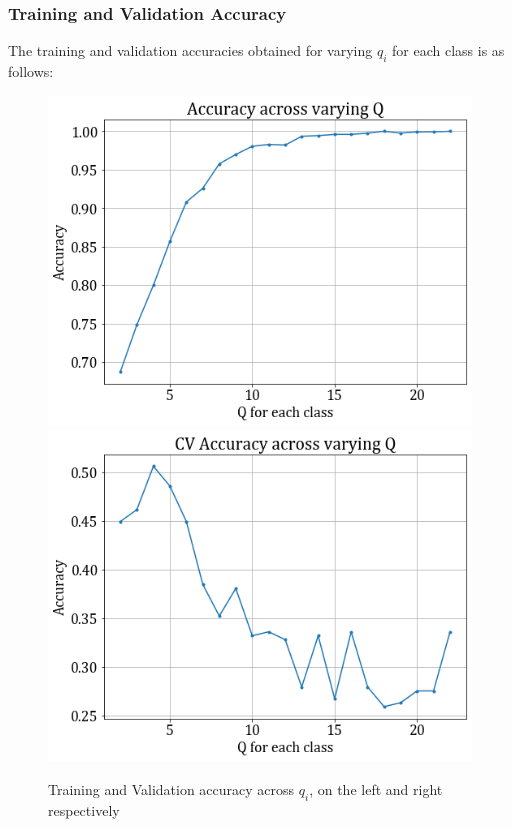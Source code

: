 \documentclass[11pt,a4paper]{article}
\begin{document}
\subsubsection{Training and Validation Accuracy}
The training and validation accuracies obtained for varying $q_i$ for each class is as follows:
\begin{figure}[H]
    \hspace{-2em}
    \includegraphics[scale=0.5]{images/2a_full_train_acc.png}
    \includegraphics[scale=0.5]{images/2a_full_val_acc.png}
    \caption{Training and Validation accuracy across $q_i$, on the left and right respectively}
\end{figure}
\end{document}
